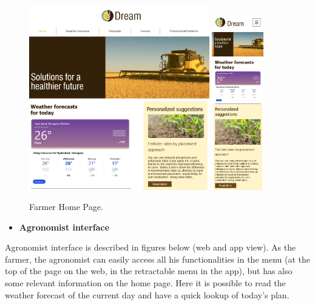 \documentclass{article}
\begin{document}
    \begin{figure} [h]
        \centering
        \includegraphics[width=0.7\textwidth]{images/interfaces/FarmerWeb.png}
        \quad
        \includegraphics[width=0.2\textwidth]{images/interfaces/FarmerApp.png}
        \quad
        \caption{\label{fig:frog}Farmer Home Page.}
    \end{figure}
    
    \newpage



    \begin{itemize}
        \item \textbf{Agronomist interface}
    \end{itemize}
    
    Agronomist interface is described in figures below (web and app view). As the farmer, the agronomist can easily access all his functionalities in the menu (at the top of the page on the web, in the retractable menu in the app), but has also some relevant information on the home page. Here it is possible to read the weather forecast of the current day and have a quick lookup of today's plan.
    
\end{document}
